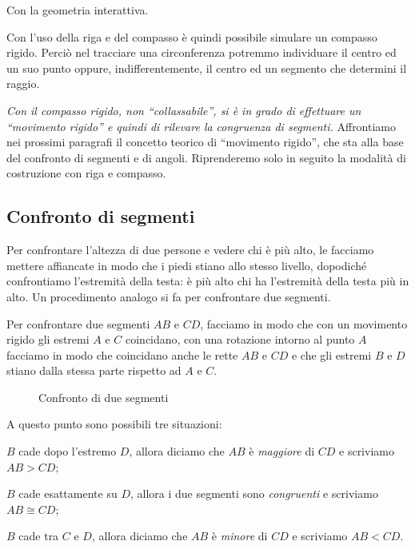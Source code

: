 \ifcoding
Con la geometria interattiva.


\fi

Con l'uso della riga e del compasso è quindi possibile simulare un compasso 
rigido. 
Perciò nel tracciare una circonferenza potremmo individuare il centro ed un suo 
punto oppure, indifferentemente, il centro ed un segmento che determini il 
raggio.

\textit{Con il compasso rigido, non ``collassabile'', si è in grado di 
effettuare un ``movimento rigido'' e quindi di rilevare la congruenza di 
segmenti.}
Affrontiamo nei prossimi paragrafi il concetto teorico di ``movimento rigido'', 
che sta alla base del confronto di segmenti e di angoli. Riprenderemo solo in 
seguito la modalità di costruzione con riga e compasso.

\subsection{Confronto di segmenti}

Per confrontare l'altezza di due persone e vedere chi è più alto, le 
facciamo mettere affiancate in modo che i piedi stiano allo stesso 
livello, dopodiché confrontiamo l'estremità della testa: è più alto 
chi ha l'estremità della testa più in alto. Un procedimento analogo 
si fa per confrontare due segmenti.

Per confrontare due segmenti $AB$ e $CD$, facciamo in modo che con un 
movimento rigido gli estremi $A$ e $C$ coincidano, con una rotazione 
intorno al punto $A$ facciamo in  modo che coincidano anche le rette 
$AB$ e $CD$ e che gli estremi $B$ e $D$ stiano dalla stessa parte 
rispetto ad $A$ e $C$.


\begin{inaccessibleblock}
 \begin{figure}[htb]
\centering
\caption{Confronto di due segmenti}
\end{figure}
\end{inaccessibleblock}

A questo punto sono possibili tre situazioni:
\begin{itemize*}
\item $B$ cade dopo l'estremo $D$, allora diciamo che $AB$ è 
\emph{maggiore} di $CD$ e scriviamo $AB>CD$;
\item $B$ cade esattamente su $D$, allora i due segmenti sono 
\emph{congruenti} e scriviamo $AB\cong CD$;
\item $B$ cade tra $C$ e $D$, allora diciamo che $AB$ è \emph{minore} 
di $CD$ e scriviamo $AB<CD$.
\end{itemize*}

